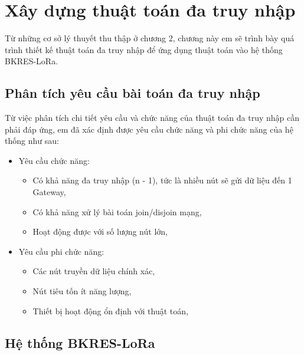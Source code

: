 \chapter{Xây dựng thuật toán đa truy nhập}
\label{chapter3}
Từ những cơ sở lý thuyết thu thập ở chương 2, chương này em sẽ trình bày quá trình thiết kế thuật toán đa truy nhập để ứng dụng thuật toán vào hệ thống BKRES-LoRa.
\section{Phân tích yêu cầu bài toán đa truy nhập}
Từ việc phân tích chi tiết yêu cầu và chức năng của thuật toán đa truy nhập cần phải đáp ứng, em đã xác định được yêu cầu chức năng và phi chức năng của hệ thống như sau:
\begin{itemize}
\item	Yêu cầu chức năng:
	\begin{itemize}
	\item	Có khả năng đa truy nhập (n - 1), tức là nhiều nút sẽ gửi dữ liệu đến 1 Gateway,			    \item	Có khả năng xử lý bài toán join/disjoin mạng,
	\item	Hoạt động được với số lượng nút lớn,
	\end{itemize}
\item Yêu cầu phi chức năng:  
	\begin{itemize}
	\item 	Các nút truyền dữ liệu chính xác,
	\item 	Nút tiêu tốn ít năng lượng,
	\item	Thiết bị hoạt động ổn định với thuật toán,
	\end{itemize}
\end{itemize}
\section{Hệ thống BKRES-LoRa}
